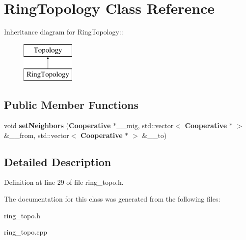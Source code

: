 \section{Ring\-Topology Class Reference}
\label{class_ring_topology}
Inheritance diagram for Ring\-Topology::\begin{figure}[H]
\begin{center}
\leavevmode
\includegraphics[height=2cm]{class_ring_topology}
\end{center}
\end{figure}
\subsection*{Public Member Functions}
\begin{CompactItemize}
\item 
void {\bf set\-Neighbors} ({\bf Cooperative} $\ast$\_\-\_\-mig, std::vector$<$ {\bf Cooperative} $\ast$ $>$ \&\_\-\_\-from, std::vector$<$ {\bf Cooperative} $\ast$ $>$ \&\_\-\_\-to)\label{class_ring_topology_292a7746993788f96042f2f628cfcbc5}

\end{CompactItemize}


\subsection{Detailed Description}




Definition at line 29 of file ring\_\-topo.h.

The documentation for this class was generated from the following files:\begin{CompactItemize}
\item 
ring\_\-topo.h\item 
ring\_\-topo.cpp\end{CompactItemize}
